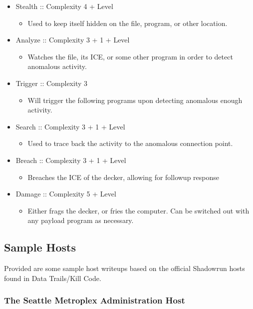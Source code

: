 \begin{multicols}{2}
	\begin{itemize}
		\itemsep 0pt
		\item Stealth :: Complexity 4 + Level
		\begin{itemize}
			\itemsep 0pt
			\item Used to keep itself hidden on the file, program, or other location.
		\end{itemize}
		\item Analyze :: Complexity 3 + 1 + Level
		\begin{itemize}
			\itemsep 0pt
			\item Watches the file, its ICE, or some other program in order to detect anomalous activity.
		\end{itemize}
		\item Trigger :: Complexity 3
		\begin{itemize}
			\itemsep 0pt
			\item Will trigger the following programs upon detecting anomalous enough activity.
		\end{itemize}
		\item Search :: Complexity 3 + 1 + Level
		\begin{itemize}
			\itemsep 0pt
			\item Used to trace back the activity to the anomalous connection point.
		\end{itemize}
		\item Breach :: Complexity 3 + 1 + Level
		\begin{itemize}
			\itemsep 0pt
			\item Breaches the ICE of the decker, allowing for followup response
		\end{itemize}
		\item Damage :: Complexity 5 + Level
		\begin{itemize}
			\itemsep 0pt
			\item Either frags the decker, or fries the computer. Can be switched out with any payload program as necessary.
		\end{itemize}
	\end{itemize}

	
	\subsection{Sample Hosts}
	
	Provided are some sample host writeups based on the official Shadowrun hosts found in Data Trails/Kill Code.
	
	\subsubsection{The Seattle Metroplex Administration Host}
	

\end{multicols}
